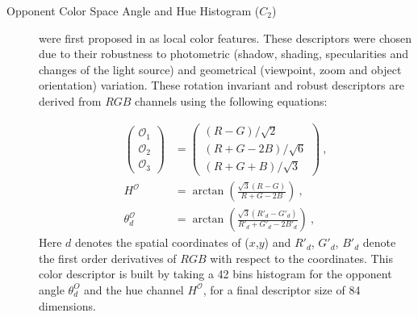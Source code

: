 \begin{description}
\item[Opponent Color Space Angle and Hue Histogram ($C_{2}$)] were first proposed in \cite{van2006coloring} as local color features.
These descriptors were chosen due to their robustness to photometric (shadow, shading, specularities and changes of the light source) and geometrical (viewpoint, zoom and object orientation) variation.
These rotation invariant and robust descriptors are derived from $RGB$ channels using the following equations: 

\begin{subequations}
\begin{align}
	\begin{pmatrix}
	\mathcal{O}_{1}\\\mathcal{O}_{2} \\\mathcal{O}_{3}
	\end{pmatrix} & =
	\begin{pmatrix}
	(R-G)/\sqrt{2}\\
	(R+G-2B)/\sqrt{6}\\
	(R+G+B)/\sqrt{3}
	\end{pmatrix}~, \label{eq:opponent}\\	 
	H^{\mathcal{O}} & = \arctan\left(\frac{\sqrt{3}(R-G)}{R+G-2B}\right)~,\\
	\theta_{d}^{\mathcal{O}} & = \arctan\left(\frac{\sqrt{3}(R'_{d}-G'_{d})}{R'_{d}+G'_{d}-2B'_{d}}\right)~,	
\end{align}
\label{eq:HueOppAngle}
\end{subequations}	
\noindent Here $d$ denotes the spatial coordinates of ($x$,$y$) and $R'_{d}$, $G'_{d}$, $B'_{d}$ denote the first order derivatives of $RGB$ with respect to the coordinates.
This color descriptor is built by taking a 42 bins histogram for the opponent angle $\theta^{O}_{d}$ and the hue channel $H^{\mathcal{O}}$, for a final descriptor size of 84 dimensions.


\end{description}
